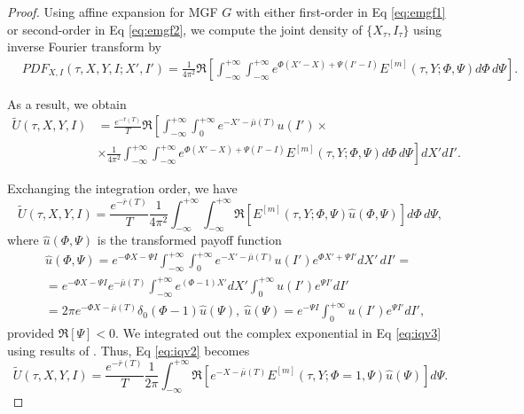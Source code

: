 \documentclass[11pt,a4paper] {article}
\begin{document}
\begin{proof}
Using affine expansion for MGF $G$  with either first-order in Eq \eqref{eq:emgf1} or second-order in Eq \eqref{eq:emgf2}, we compute the joint density of $\{X_\tau, I_\tau\}$ using inverse Fourier transform by
\begin{equation*}
\begin{split}
&PDF_{X,I}(\tau, X, Y,I;X',I')=\frac{1}{4\pi^2}\Re\left[\int_{-\infty}^{+\infty}\int_{-\infty}^{+\infty}e^{\Phi (X'-X)+\Psi (I'-I)}E^{[m]}(\tau,Y;\Phi,\Psi)d\Phi\,d\Psi\right].
\end{split}
\end{equation*}

As a result, we obtain
\begin{equation*}
\begin{split}
\tilde{U}(\tau, X, Y, I)&=\frac{e^{-\bar{r}(T)}}{T}\Re\left[
\int_{-\infty}^{+\infty}\int_0^{+\infty}e^{-X'-\bar{\mu}(T)}u(I')\times\right.\\
&\left. \times
\frac{1}{4\pi^2}\int_{-\infty}^{+\infty}\int_{-\infty}^{+\infty}e^{\Phi (X'-X)+\Psi (I'-I)}E^{[m]}(\tau,Y;\Phi,\Psi)d\Phi\,d\Psi\right]dX'dI'.
\end{split}
\end{equation*}

Exchanging the integration order, we have
\begin{equation}\label{eq:iqv2}
\tilde{U}(\tau, X, Y, I)=\frac{e^{-\bar{r}(T)}}{T}\frac{1}{4\pi^2}\int_{-\infty}^{+\infty}\int_{-\infty}^{+\infty}\Re\left[E^{[m]}(\tau,Y;\Phi,\Psi)\hat{u}(\Phi,\Psi)\right]d\Phi\,d\Psi,
\end{equation}
where $\hat{u}(\Phi,\Psi)$ is the transformed payoff function
\begin{equation}\label{eq:iqv3}
\begin{split}
&\hat{u}(\Phi,\Psi)=e^{-\Phi X-\Psi I}\int_{-\infty}^{+\infty}\int_0^{+\infty}e^{-X'-\bar{\mu}(T)}u(I')e^{\Phi X'+\Psi I'}dX'\,dI'=\\
&=e^{-\Phi X-\Psi I}e^{-\bar{\mu}(T)}\int_{-\infty}^{+\infty}e^{(\Phi-1)X'}dX'\int_0^{+\infty}u(I')e^{\Psi I'}dI'\\
& =2\pi e^{-\Phi X-\bar{\mu}(T)}\delta_0(\Phi-1)\hat{u}(\Psi), \ \hat{u}(\Psi)=e^{-\Psi I}\int_0^{+\infty}u(I')e^{\Psi I'}dI',
\end{split}
\end{equation}
provided $\Re[\Psi]<0$. We integrated out the complex exponential in Eq \eqref{eq:iqv3} using results of \cite{Sepp2007}. 
Thus, Eq \eqref{eq:iqv2} becomes
\begin{equation}
\tilde{U}(\tau, X, Y, I)=\frac{e^{-\bar{r}(T)}}{T}\frac{1}{2\pi}\int_{-\infty}^{+\infty}\Re\left[e^{-X-\bar{\mu}(T)}E^{[m]}(\tau,Y;\Phi=1,\Psi)\hat{u}(\Psi)\right]d\Psi. 
\end{equation}
\end{proof}
\end{document}
